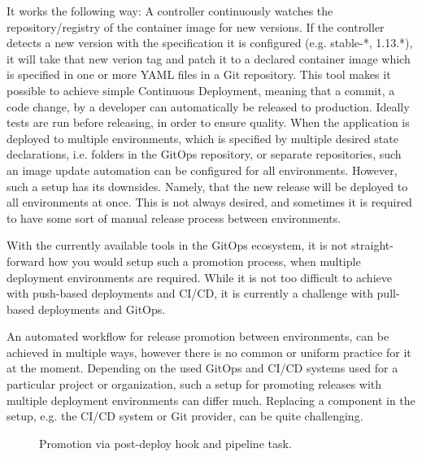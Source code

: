 It works the following way: A controller continuously watches the repository/registry of the container image for new versions.
If the controller detects a new version with the specification it is configured (e.g. stable-*, 1.13.*),
it will take that new verion tag and patch it to a declared container image which is specified in one or more YAML files in a Git repository.
This tool makes it possible to achieve simple Continuous Deployment,
meaning that a commit, a code change, by a developer can automatically be released to production.
Ideally tests are run before releasing, in order to ensure quality.
When the application is deployed to multiple environments, which is specified by multiple desired state declarations,
i.e. folders in the GitOps repository, or separate repositories,
such an image update automation can be configured for all environments.
However, such a setup has its downsides.
Namely, that the new release will be deployed to all environments at once.
This is not always desired, and sometimes it is required to have some sort of manual release process between environments.

With the currently available tools in the GitOps ecosystem,
it is not straight-forward how you would setup such a promotion process,
when multiple deployment environments are required.
While it is not too difficult to achieve with push-based deployments and CI/CD,
it is currently a challenge with pull-based deployments and GitOps.


An automated workflow for release promotion between environments,
can be achieved in multiple ways,
however there is no common or uniform practice for it at the moment.
Depending on the used GitOps and CI/CD systems used for a particular project or organization,
such a setup for promoting releases with multiple deployment environments can differ much.
Replacing a component in the setup, e.g. the CI/CD system or Git provider, can be quite challenging.

\begin{figure}[h]
	\centering
	\caption{Promotion via post-deploy hook and pipeline task.
	}
	\label{fig:promotion-by-pipeline-task-post-deploy-hook}	
\end{figure}

